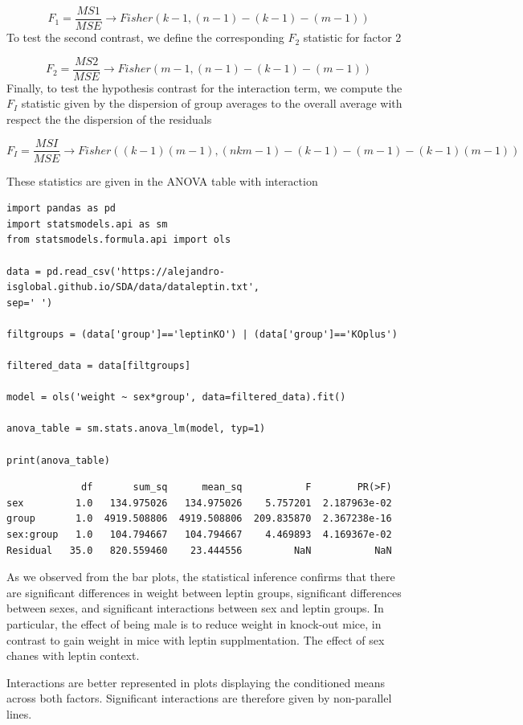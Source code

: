 \documentclass[
]{book}
\begin{document}
\[F_1=\frac{MS1}{MSE} \rightarrow Fisher(k-1,(n-1)-(k-1)-(m-1))\]
To test the second contrast, we define the corresponding \(F_2\) statistic for factor 2

\[F_2=\frac{MS2}{MSE} \rightarrow Fisher(m-1,(n-1)-(k-1)-(m-1))\]
Finally, to test the hypothesis contrast for the interaction term, we compute the \(F_I\) statistic given by the dispersion of group averages to the overall average with respect the the dispersion of the residuals

\[F_I=\frac{MSI}{MSE}\rightarrow Fisher((k-1)(m-1),(nkm-1) -(k-1)-(m-1)-(k-1)(m-1))\]

These statistics are given in the ANOVA table with interaction

\begin{verbatim}
import pandas as pd
import statsmodels.api as sm
from statsmodels.formula.api import ols

data = pd.read_csv('https://alejandro-isglobal.github.io/SDA/data/dataleptin.txt', 
sep=' ')

filtgroups = (data['group']=='leptinKO') | (data['group']=='KOplus')

filtered_data = data[filtgroups]

model = ols('weight ~ sex*group', data=filtered_data).fit()

anova_table = sm.stats.anova_lm(model, typ=1)

print(anova_table)
\end{verbatim}

\begin{verbatim}
             df       sum_sq      mean_sq           F        PR(>F)
sex         1.0   134.975026   134.975026    5.757201  2.187963e-02
group       1.0  4919.508806  4919.508806  209.835870  2.367238e-16
sex:group   1.0   104.794667   104.794667    4.469893  4.169367e-02
Residual   35.0   820.559460    23.444556         NaN           NaN
\end{verbatim}

As we observed from the bar plots, the statistical inference confirms that there are significant differences in weight between leptin groups, significant differences between sexes, and significant interactions between sex and leptin groups. In particular, the effect of being male is to reduce weight in knock-out mice, in contrast to gain weight in mice with leptin supplmentation. The effect of sex chanes with leptin context.

Interactions are better represented in plots displaying the conditioned means across both factors. Significant interactions are therefore given by non-parallel lines.
\end{document}
